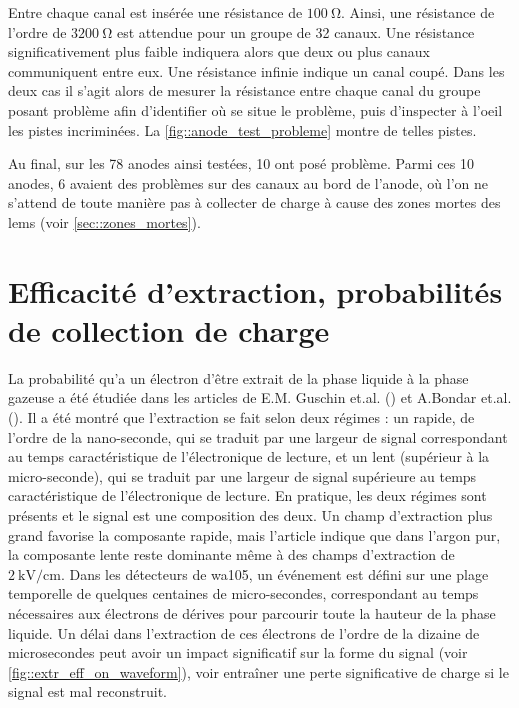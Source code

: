             Entre chaque canal est insérée une résistance de $\SI{100}{\ohm}$. Ainsi, une résistance de l'ordre de $\SI{3200}{\ohm}$ est attendue pour un groupe de 32 canaux. Une résistance significativement plus faible indiquera alors que deux ou plus canaux communiquent entre eux. Une résistance infinie indique un canal coupé. Dans les deux cas il s'agit alors de mesurer la résistance entre chaque canal du groupe posant problème afin d'identifier où se situe le problème, puis d'inspecter à l'oeil les pistes incriminées. La \autoref{fig::anode_test_probleme} montre de telles pistes.

            Au final, sur les 78 anodes ainsi testées, 10 ont posé problème. Parmi ces 10 anodes, 6 avaient des problèmes sur des canaux au bord de l'anode, où l'on ne s'attend de toute manière pas à collecter de charge à cause des zones mortes des \glspl{lem} (voir \autoref{sec::zones_mortes}).
                        
    \section{Efficacité d'extraction, probabilités de collection de charge}
    
        La probabilité qu'a un électron d'être extrait de la phase liquide à la phase gazeuse a été étudiée dans les articles de E.M. Guschin et.al. (\cite{Guschin}) et A.Bondar et.al. (\cite{Bondar}). Il a été montré que l'extraction se fait selon deux régimes : un rapide, de l'ordre de la nano-seconde, qui se traduit par une largeur de signal correspondant au temps caractéristique de l'électronique de lecture, et un lent (supérieur à la micro-seconde), qui se traduit par une largeur de signal supérieure au temps caractéristique de l'électronique de lecture. En pratique, les deux régimes sont présents et le signal est une composition des deux. Un champ d'extraction plus grand favorise la composante rapide, mais l'article \cite{Bondar} indique que dans l'argon pur, la composante lente reste dominante même à des champs d'extraction de $\SI{2}{\kilo\volt\per\centi\meter}$. Dans les détecteurs de \gls{wa105}, un événement est défini sur une plage temporelle de quelques centaines de micro-secondes, correspondant au temps nécessaires aux électrons de dérives pour parcourir toute la hauteur de la phase liquide. Un délai dans l'extraction de ces électrons de l'ordre de la dizaine de microsecondes peut avoir un impact significatif sur la forme du signal (voir \autoref{fig::extr_eff_on_waveform}), voir entraîner une perte significative de charge si le signal est mal reconstruit.
        
